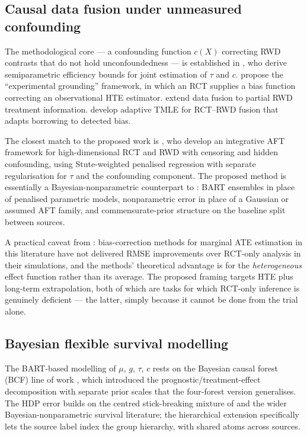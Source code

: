 \documentclass[11pt]{article}
\newcommand{\X}{X}
\newcommand{\tauf}{\tau}
\newcommand{\cf}{c}
\newcommand{\gf}{g}
\newcommand{\muf}{\mu}
\begin{document}
\subsection{Causal data fusion under unmeasured confounding}

The methodological core --- a confounding function $\cf(\X)$ correcting RWD
contrasts that do not hold unconfoundedness --- is established in
\citet{YangLiuZengWang2025}, who derive semiparametric efficiency bounds for
joint estimation of $\tauf$ and $\cf$. \citet{Kallus2018} propose the
``experimental grounding'' framework, in which an RCT supplies a bias
function correcting an observational HTE estimator. \citet{Yao2024} extend
data fusion to partial RWD treatment information. \citet{vanderLaan2024}
develop adaptive TMLE for RCT--RWD fusion that adapts borrowing to detected
bias.

The closest match to the proposed work is \citet{Ye2025}, who develop an
integrative AFT framework for high-dimensional RCT and RWD with censoring
and hidden confounding, using Stute-weighted penalised regression with
separate regularisation for $\tauf$ and the confounding component. The
proposed method is essentially a Bayesian-nonparametric counterpart to
\citet{Ye2025}: BART ensembles in place of penalised parametric models,
nonparametric error in place of a Gaussian or assumed AFT family, and
commensurate-prior structure on the baseline split between sources.

A practical caveat from \citet{Lin2024}: bias-correction methods for
marginal ATE estimation in this literature have not delivered
RMSE improvements over RCT-only analysis in their simulations, and the
methods' theoretical advantage is for the \emph{heterogeneous} effect
function rather than its average. The proposed framing targets HTE
plus long-term extrapolation, both of which are tasks for which RCT-only
inference is genuinely deficient --- the latter, simply because it cannot
be done from the trial alone.

\subsection{Bayesian flexible survival modelling}

The BART-based modelling of $\muf$, $\gf$, $\tauf$, $\cf$ rests on the
Bayesian causal forest (BCF) line of work \citep{Hahn2020}, which introduced
the prognostic/treatment-effect decomposition with separate prior scales
that the four-forest version generalises. The HDP error builds on the
centred stick-breaking mixture of \citet{Yang2010} and the wider
Bayesian-nonparametric survival literature; the hierarchical extension
specifically lets the source label index the group hierarchy, with shared
atoms across sources.
\end{document}
